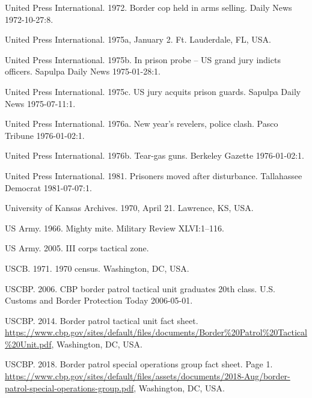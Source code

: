 \documentclass[
  11pt,
]{krantz}
\newlength{\cslhangindent}
\newenvironment{CSLReferences}[2] %
 {%
  \setlength{\parindent}{0pt}
  \ifodd #1 \everypar{\setlength{\hangindent}{\cslhangindent}}\ignorespaces\fi
  \ifnum #2 > 0
  \setlength{\parskip}{#2\baselineskip}
  \fi
 }%
 {}
\begin{document}
\begin{CSLReferences}{1}{0}
\leavevmode{}%
United Press International. 1972. Border cop held in arms selling. Daily News 1972-10-27:8.

\leavevmode{}%
United Press International. 1975a, January 2. Ft. Lauderdale, FL, USA.

\leavevmode{}%
United Press International. 1975b. In prison probe -- US grand jury indicts officers. Sapulpa Daily News 1975-01-28:1.

\leavevmode{}%
United Press International. 1975c. US jury acquits prison guards. Sapulpa Daily News 1975-07-11:1.

\leavevmode{}%
United Press International. 1976a. New year's revelers, police clash. Pasco Tribune 1976-01-02:1.

\leavevmode{}%
United Press International. 1976b. Tear-gas guns. Berkeley Gazette 1976-01-02:1.

\leavevmode{}%
United Press International. 1981. Prisoners moved after disturbance. Tallahassee Democrat 1981-07-07:1.

\leavevmode{}%
University of Kansas Archives. 1970, April 21. Lawrence, KS, USA.

\leavevmode{}%
US Army. 1966. Mighty mite. Military Review XLVI:1--116.

\leavevmode{}%
US Army. 2005. III corps tactical zone.

\leavevmode{}%
USCB. 1971. 1970 census. Washington, DC, USA.

\leavevmode{}%
USCBP. 2006. CBP border patrol tactical unit graduates 20th class. U.S. Customs and Border Protection Today 2006-05-01.

\leavevmode{}%
USCBP. 2014. Border patrol tactical unit fact sheet. \url{https://www.cbp.gov/sites/default/files/documents/Border\%20Patrol\%20Tactical\%20Unit.pdf}, Washington, DC, USA.

\leavevmode{}%
USCBP. 2018. Border patrol special operations group fact sheet. Page 1. \url{https://www.cbp.gov/sites/default/files/assets/documents/2018-Aug/border-patrol-special-operations-group.pdf}, Washington, DC, USA.


\end{CSLReferences}
\end{document}
